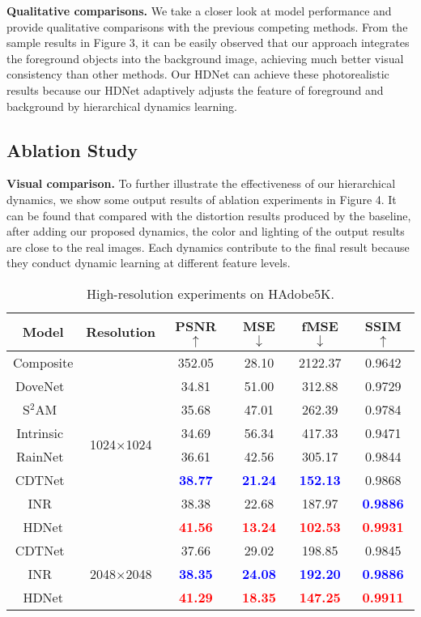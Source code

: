 \documentclass[sigconf]{acmart}
\begin{document}
\noindent
\textbf{Qualitative comparisons.} We take a closer look at model performance and provide qualitative comparisons with the previous competing methods. From the
sample results in Figure 3, it can be easily observed that our approach integrates the foreground objects into
the background image, achieving much better visual consistency than other methods. Our HDNet can achieve these photorealistic results because our HDNet adaptively adjusts the feature of foreground and background by hierarchical dynamics learning.



\subsection{Ablation Study}

\noindent
\textbf{Visual comparison.} To further illustrate the effectiveness of our hierarchical dynamics, we show some output results of ablation experiments in Figure 4. It can be found that compared with the distortion results produced by the baseline, after adding our proposed dynamics, the color and lighting of the output results are close to the real images. Each dynamics contribute to the final result because they conduct dynamic learning at different feature levels. 

\begin{table}[t]
	\centering
	\begin{tabular}{cccccc}
		\toprule
		Model&Resolution&PSNR$\uparrow$&MSE$\downarrow$&fMSE$\downarrow$&SSIM$\uparrow$\\\midrule
		Composite&\multirow{8}{*}{1024$\times$1024}&352.05&28.10&2122.37&0.9642\\
		DoveNet~\cite{DoveNet}&&34.81&51.00& 312.88&0.9729\\
		S$^{2}$AM~\cite{SSAM}&&35.68&47.01&262.39&0.9784\\
		Intrinsic~\cite{GuoZJGZ21}&&34.69&56.34&417.33& 0.9471\\
		RainNet~\cite{RAIN}& &36.61&42.56&305.17& 0.9844\\
		CDTNet~\cite{CDTNet}&&\textbf{\textcolor{blue}{38.77}}&\textbf{\textcolor{blue}{21.24}}& \textbf{\textcolor{blue}{152.13}}&0.9868\\
		INR~\cite{inr}&&38.38&22.68&187.97&\textbf{\textcolor{blue}{0.9886}}\\
		HDNet&&\textbf{\textcolor{red}{41.56}}&\textbf{\textcolor{red}{13.24}}&\textbf{\textcolor{red}{102.53}}&\textbf{\textcolor{red}{0.9931}}\\
		\midrule
		CDTNet~\cite{CDTNet}&\multirow{3}{*}{2048$\times$2048}&37.66&29.02& 198.85&0.9845\\
		INR~\cite{inr}&&\textbf{\textcolor{blue}{38.35}}&\textbf{\textcolor{blue}{24.08}}&\textbf{\textcolor{blue}{192.20}}&\textbf{\textcolor{blue}{0.9886}}\\
		HDNet&&\textbf{\textcolor{red}{41.29}}&\textbf{\textcolor{red}{18.35}}&\textbf{\textcolor{red}{147.25}}&\textbf{\textcolor{red}{0.9911}}\\
		\bottomrule
	\end{tabular}
	\caption{High-resolution experiments on HAdobe5K.}
\end{table}
\end{document}
